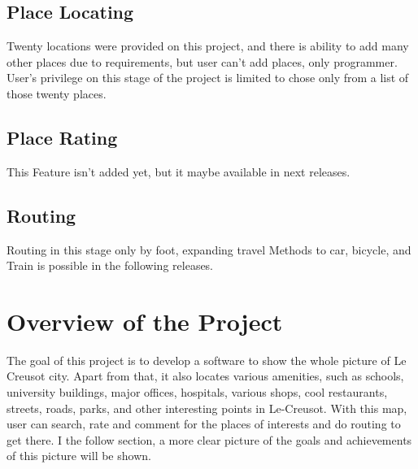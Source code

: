 \documentclass[a4paper, 12pt, english]{book}
\begin{document}
\subsection{Place Locating}
Twenty locations were provided on this project, and there is ability to add many other places due to requirements, but user can't add places, only programmer.
User's privilege on this stage of the project is limited to chose only from a list of those twenty places.
\subsection{Place Rating}
This Feature isn't added yet, but it maybe available in next releases.
\subsection{Routing}
Routing in this stage only by foot, expanding travel Methods to car, bicycle, and Train is possible in the following releases. 
\section{Overview of the Project}


The goal of this project is to develop a software to show the whole picture of Le Creusot city. Apart from that, it also locates various amenities, such as schools, university buildings, major offices, hospitals, various shops, cool restaurants, streets, roads, parks, and other interesting points in Le-Creusot. With this map, user can search, rate and comment for the places of interests and do routing to get there. I the follow section, a more clear picture of the goals and achievements of this picture will be shown. \\
\end{document}
